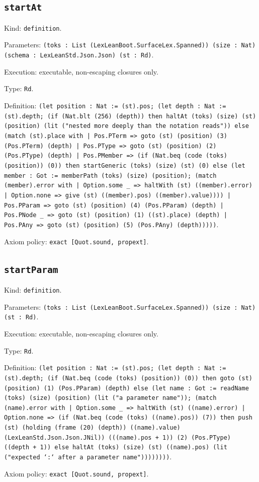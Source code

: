 \documentclass[11pt]{article}
\begin{document}
\subsection*{\texttt{startAt}}
\noindent Kind: \texttt{definition}.\par
\noindent Parameters: \texttt{(toks : List (LexLeanBoot.SurfaceLex.Spanned)) (size : Nat) (schema : LexLeanStd.Json.Json) (st : Rd)}.\par
\noindent Execution: executable, non-escaping closures only.\par
\noindent Type: \texttt{Rd}.\par
\noindent Definition: \texttt{(let position : Nat := (st).pos; (let depth : Nat := (st).depth; (if (Nat.blt (256) (depth)) then haltAt (toks) (size) (st) (position) (lit ("nested more deeply than the notation reads")) else (match (st).place with | Pos.PTerm => goto (st) (position) (3) (Pos.PTerm) (depth) | Pos.PType => goto (st) (position) (2) (Pos.PType) (depth) | Pos.PMember => (if (Nat.beq (code (toks) (position)) (0)) then startGeneric (toks) (size) (st) (0) else (let member : Got := memberPath (toks) (size) (position); (match (member).error with | Option.some \_ => haltWith (st) ((member).error) | Option.none => give (st) ((member).pos) ((member).value)))) | Pos.PParam => goto (st) (position) (4) (Pos.PParam) (depth) | Pos.PNode \_ => goto (st) (position) (1) ((st).place) (depth) | Pos.PAny => goto (st) (position) (5) (Pos.PAny) (depth)))))}.\par
\noindent Axiom policy: \texttt{exact [Quot.sound, propext]}.\par
\subsection*{\texttt{startParam}}
\noindent Kind: \texttt{definition}.\par
\noindent Parameters: \texttt{(toks : List (LexLeanBoot.SurfaceLex.Spanned)) (size : Nat) (st : Rd)}.\par
\noindent Execution: executable, non-escaping closures only.\par
\noindent Type: \texttt{Rd}.\par
\noindent Definition: \texttt{(let position : Nat := (st).pos; (let depth : Nat := (st).depth; (if (Nat.beq (code (toks) (position)) (0)) then goto (st) (position) (1) (Pos.PParam) (depth) else (let name : Got := readName (toks) (size) (position) (lit ("a parameter name")); (match (name).error with | Option.some \_ => haltWith (st) ((name).error) | Option.none => (if (Nat.beq (code (toks) ((name).pos)) (7)) then push (st) (holding (frame (20) (depth)) ((name).value) (LexLeanStd.Json.Json.JNil)) (((name).pos + 1)) (2) (Pos.PType) ((depth + 1)) else haltAt (toks) (size) (st) ((name).pos) (lit ("expected `:` after a parameter name"))))))))}.\par
\noindent Axiom policy: \texttt{exact [Quot.sound, propext]}.\par
\end{document}
